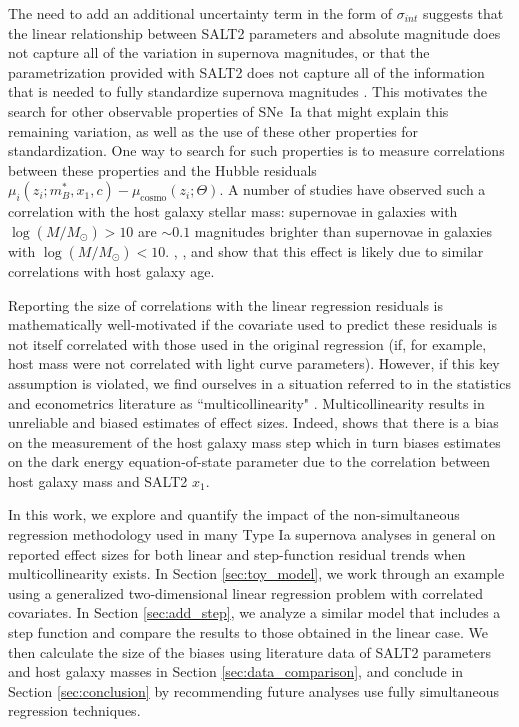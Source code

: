 The need to add an additional uncertainty term in the form of $\sigma_{int}$ suggests that the linear relationship between SALT2 parameters and absolute magnitude does not capture all of the variation in supernova magnitudes, or that the parametrization provided with SALT2 does not capture all of the information that is needed to fully standardize supernova magnitudes \citep{Saunders2018}. This motivates the search for other observable properties of SNe~Ia that might explain this remaining variation, as well as the use of these other properties for standardization. One way to search for such properties is to measure correlations between these properties and the Hubble residuals $\mu_i(z_i;m_B^*, x_1, c)-\mu_\text{cosmo}(z_i;\Theta)$. A number of studies \citep{Kelly10, Lampeitl10, Sullivan10, Childress13} have observed such a correlation with the host galaxy stellar mass: supernovae in galaxies with $\log(M/M_\odot) > 10$ are $\sim0.1$ magnitudes brighter than supernovae in galaxies with $\log(M/M_\odot) < 10$. \cite{Rigault13}, \cite{Childress14}, and  \cite{Rigault15} show that this effect is likely due to similar correlations with host galaxy age.

Reporting the size of correlations with the linear regression residuals is mathematically well-motivated if the covariate used to predict these residuals is not itself correlated with those used in the original regression (if, for example, host mass were not correlated with light curve parameters). However, if this key assumption is violated, we find ourselves in a situation referred to in the statistics and econometrics literature as ``multicollinearity" \cite[e.g.][]{Farrar67}. Multicollinearity results in unreliable and biased estimates of effect sizes. Indeed, \cite{Smith20} shows that there is a bias on the measurement of the host galaxy mass step which in turn biases estimates on the dark energy equation-of-state parameter due to the correlation between host galaxy mass and SALT2 $x_1$.

In this work, we explore and quantify the impact of the non-simultaneous regression methodology used in many Type Ia supernova analyses in general on reported effect sizes for both linear and step-function residual trends when multicollinearity exists. In Section \ref{sec:toy_model}, we work through an example using a generalized two-dimensional linear regression problem with correlated covariates. In Section \ref{sec:add_step}, we analyze a similar model that includes a step function and compare the results to those obtained in the linear case. We then calculate the size of the biases using literature data of SALT2 parameters and host galaxy masses in Section \ref{sec:data_comparison}, and conclude in Section \ref{sec:conclusion} by recommending future analyses use fully simultaneous regression techniques.

